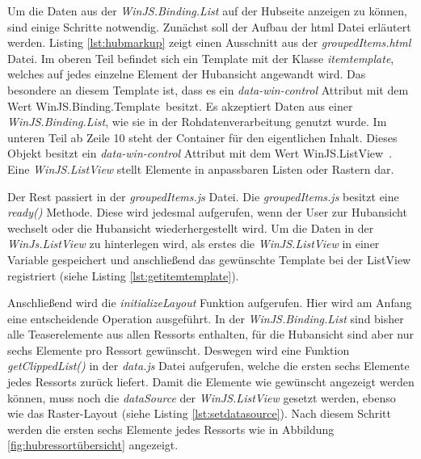 \documentclass[12pt,a4paper,bibtotoc,abstracton]{scrartcl}
\begin{document}
Um die Daten aus der \textit{WinJS.Binding.List} auf der Hubseite anzeigen zu können, sind einige Schritte notwendig. Zunächst soll der Aufbau der \ac{html} Datei erläutert werden. Listing \ref{lst:hubmarkup} zeigt einen Ausschnitt aus der \textit{groupedItems.html} Datei. Im oberen Teil befindet sich ein Template mit der Klasse \textit{itemtemplate}, welches auf jedes einzelne Element der Hubansicht angewandt wird. Das besondere an diesem Template ist, dass es ein \textit{data-win-control} Attribut mit dem Wert \glqq WinJS.Binding.Template\grqq\ besitzt. Es akzeptiert Daten aus einer \textit{WinJS.Binding.List}, wie sie in der Rohdatenverarbeitung genutzt wurde. Im unteren Teil ab Zeile 10 steht der Container für den eigentlichen Inhalt. Dieses Objekt besitzt ein \textit{data-win-control} Attribut mit dem Wert \glqq WinJS.ListView\grqq\ . Eine \textit{WinJS.ListView} stellt Elemente in anpassbaren Listen oder Rastern dar. 

\begin{minipage}{\linewidth}
  
\end{minipage}

Der Rest passiert in der \textit{groupedItems.js} Datei. Die \textit{groupedItems.js} besitzt eine \textit{ready()} Methode. Diese wird jedesmal aufgerufen, wenn der User zur Hubansicht wechselt oder die Hubansicht wiederhergestellt wird. Um die Daten in der \textit{WinJs.ListView} zu hinterlegen wird, als erstes die \textit{WinJS.ListView} in einer Variable gespeichert und anschließend das gewünschte Template bei der ListView registriert (siehe Listing \ref{lst:getitemtemplate}). 

\begin{minipage}{\linewidth}
  
\end{minipage}

Anschließend wird die \textit{initializeLayout} Funktion aufgerufen. Hier wird am Anfang eine entscheidende Operation ausgeführt. In der \textit{WinJS.Binding.List} sind bisher alle Teaserelemente aus allen Ressorts enthalten, für die Hubansicht sind aber nur sechs Elemente pro Ressort gewünscht. Deswegen wird eine Funktion \textit{getClippedList()} in der \textit{data.js} Datei aufgerufen, welche die ersten sechs Elemente jedes Ressorts zurück liefert. Damit die Elemente wie gewünscht angezeigt werden können, muss noch die \textit{dataSource} der \textit{WinJS.ListView} gesetzt werden, ebenso wie das Raster-Layout (siehe Listing \ref{lst:setdatasource}). Nach diesem Schritt werden die ersten sechs Elemente jedes Ressorts wie in Abbildung \ref{fig:hubressortübersicht} angezeigt.
\end{document}
